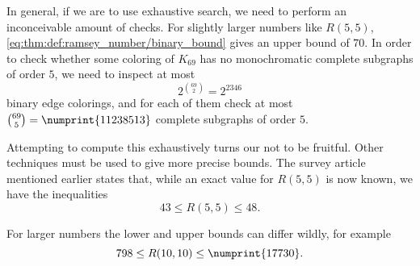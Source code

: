 \begin{remark}
  In general, if we are to use exhaustive search, we need to perform an inconceivable amount of checks. For slightly larger numbers like \( R(5, 5) \), \eqref{eq:thm:def:ramsey_number/binary_bound} gives an upper bound of \( 70 \). In order to check whether some coloring of \( K_{69} \) has no monochromatic complete subgraphs of order \( 5 \), we need to inspect at most
  \begin{equation*}
    2^{\binom {69} 2} = 2^{2346}
  \end{equation*}
  binary edge colorings, and for each of them check at most \( \binom {69} 5 = \numprint{11 238 513} \) complete subgraphs of order \( 5 \).

  Attempting to compute this exhaustively turns our not to be fruitful. Other techniques must be used to give more precise bounds. The survey article \cite[4]{Radziszowski2021} mentioned earlier states that, while an exact value for \( R(5, 5) \) is now known, we have the inequalities
  \begin{equation*}
    43 \leq R(5, 5) \leq 48.
  \end{equation*}

  For larger numbers the lower and upper bounds can differ wildly, for example
  \begin{equation*}
    798 \leq R(10, 10) \leq \numprint{17 730}.
  \end{equation*}
\end{remark}
